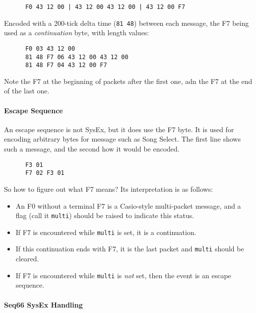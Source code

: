    \begin{verbatim}
      F0 43 12 00 | 43 12 00 43 12 00 | 43 12 00 F7
   \end{verbatim}

   Encoded with a 200-tick delta time (\texttt{81 48}) between each message,
   the F7 being used as a \textsl{continuation} byte, with length values:

   \begin{verbatim}
      F0 03 43 12 00
      81 48 F7 06 43 12 00 43 12 00
      81 48 F7 04 43 12 00 F7
   \end{verbatim}

   Note the F7 at the beginning of packets after the first one, adn
   the F7 at the end of the last one.

\paragraph{Escape Sequence}
\label{paragraph:patterns_escape_sequence}

   An escape sequence is not SysEx, but it does use the F7 byte.
   It is used for encoding arbitrary bytes for message such as Song Select.
   The first line shows such a message, and the second how it would be encoded.

   \begin{verbatim}
      F3 01
      F7 02 F3 01
   \end{verbatim}

   So how to figure out what F7 means?
   Its interpretation is as follows:

   \begin{itemize}
      \item An F0 without a terminal F7 is a Casio-style multi-packet message,
         and a flag (call it \texttt{multi})
         should be raised to indicate this status.
      \item If F7 is encountered while \texttt{multi} is set,
         it is a continuation.
      \item If this continuation ends with F7, it is the last packet and
         \texttt{multi} should be cleared.
      \item If F7 is encountered while \texttt{multi} is \textsl{not} set,
         then the event is an escape sequence.
   \end{itemize}

\paragraph{Seq66 SysEx Handling}
\label{paragraph:patterns_pattern_keys}

